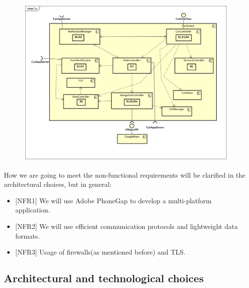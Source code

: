 \documentclass[]{article}
\providecommand{\tightlist}{%
  \setlength{\itemsep}{0pt}\setlength{\parskip}{0pt}}
\begin{document}
\begin{figure}
\centering
\includegraphics[width=1.00000\textwidth,height=1.00000\textwidth]{./comp_diagrams/car_reqt.png}
\caption{}\label{id}
\end{figure}

How we are going to meet the non-functional requirements will be
clarified in the architectural choices, but in general:

\begin{itemize}
\tightlist
\item
  {[}NFR1{]} We will use Adobe PhoneGap to develop a multi-platform
  application.
\item
  {[}NFR2{]} We will use efficient communication protocols and
  lightweight data formats.
\item
  {[}NFR3{]} Usage of firewalls(as mentioned before) and TLS.
\end{itemize}

\subsection{Architectural and technological
choices}\label{architectural-and-technological-choices}
\end{document}
